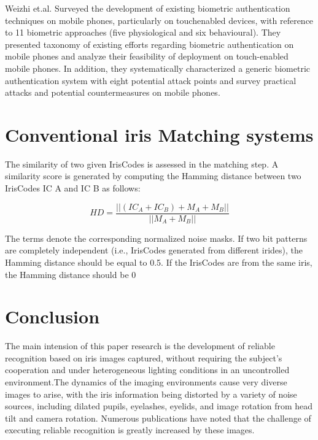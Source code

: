 \documentclass[9pt,twocolumn,twoside]{osajnl}
\begin{document}
 Weizhi et.al. \cite{sam:1} Surveyed the development of existing biometric authentication techniques on mobile phones, particularly on touchenabled devices, with reference to 11 biometric approaches (five physiological and six behavioural). They presented taxonomy of existing efforts regarding biometric authentication on mobile phones and analyze their feasibility of deployment on touch-enabled mobile phones. In addition, they systematically characterized a generic biometric authentication system with eight potential attack points and survey practical attacks and potential countermeasures on mobile phones.

\section{ Conventional iris Matching systems}

The similarity of two given IrisCodes is assessed in the matching step. A similarity score is generated by computing the Hamming distance between two IrisCodes IC A and IC B as follows: 

\begin{equation}
HD = \frac{||(IC_A + IC_B) + M_A + M_B||}{||M_A + M_B||}
\label{eq:refname1}
\end{equation}

The terms denote the corresponding normalized noise masks. If two bit patterns are completely independent (i.e., IrisCodes generated from different irides), the Hamming distance should be equal to 0.5. If the IrisCodes are from the same iris, the Hamming distance should be 0

\section{Conclusion}

The main intension of this paper research is the development of reliable recognition based on iris images captured, without requiring the subject’s cooperation and under heterogeneous lighting conditions in an uncontrolled environment.The dynamics of the imaging environments cause very diverse images to arise, with the iris information being distorted by a variety of noise sources, including dilated pupils, eyelashes, eyelids, and image rotation from head tilt and camera rotation. Numerous publications have noted that the challenge of executing reliable recognition is greatly increased by these images.


  
\end{document}
